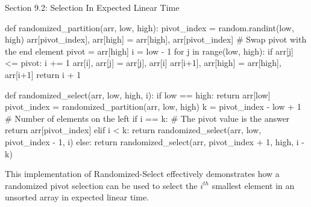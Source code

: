 \begin{notes}{Section 9.2: Selection In Expected Linear Time}
\begin{highlight}
\begin{code}[Python]
    def randomized_partition(arr, low, high):
        pivot_index = random.randint(low, high)
        arr[pivot_index], arr[high] = arr[high], arr[pivot_index]  # Swap pivot with the end element
        pivot = arr[high]
        i = low - 1
        for j in range(low, high):
            if arr[j] <= pivot:
                i += 1
                arr[i], arr[j] = arr[j], arr[i]
        arr[i+1], arr[high] = arr[high], arr[i+1]
        return i + 1
    
    def randomized_select(arr, low, high, i):
        if low == high:
            return arr[low]
        pivot_index = randomized_partition(arr, low, high)
        k = pivot_index - low + 1  # Number of elements on the left
        if i == k:  # The pivot value is the answer
            return arr[pivot_index]
        elif i < k:
            return randomized_select(arr, low, pivot_index - 1, i)
        else:
            return randomized_select(arr, pivot_index + 1, high, i - k)
    \end{code}
        This implementation of Randomized-Select effectively demonstrates how a randomized pivot selection can be used to select the $i^{th}$ smallest element in an unsorted array in expected linear time.
    \end{highlight}      
\end{notes}